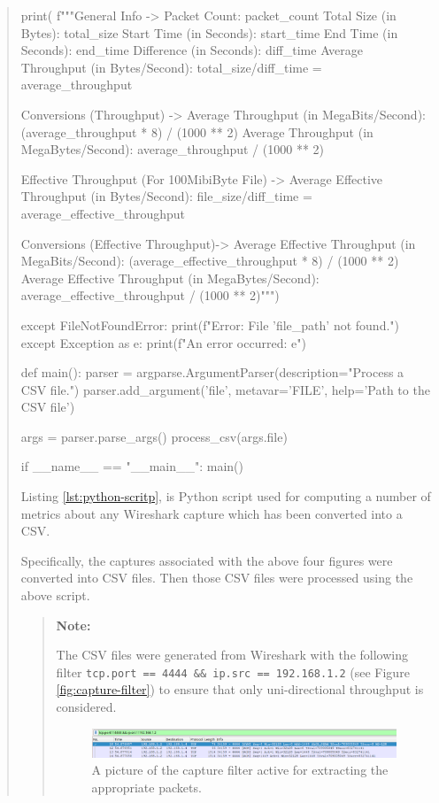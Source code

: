 \documentclass{article}
\newenvironment{ans}
{\fbox{Answer}\begin{quote}\nopagebreak}
{\end{quote}}
\newenvironment{note}{%
\begin{quote}
\begin{tcolorbox}[colback=gray!10,arc=0mm,boxrule=0pt]
\raggedright
\textbf{Note:}%
}{%
\end{tcolorbox}
\end{quote}%
}
\begin{document}
\begin{ans}
\begin{gruvboxlisting}[language=Python,caption={A Python script for computing a
number of statistics about any Wireshark capture.},label={lst:python-scritp}]
print( f"""General Info -> Packet Count: {packet_count}
Total Size (in Bytes): {total_size} Start Time (in
Seconds): {start_time} End Time (in Seconds): {end_time}
Difference (in Seconds): {diff_time} Average Throughput (in
Bytes/Second): {total_size}/{diff_time} =
{average_throughput}

Conversions (Throughput) -> Average Throughput (in
MegaBits/Second): {(average_throughput * 8) / (1000 ** 2)}
Average Throughput (in MegaBytes/Second):
{average_throughput / (1000 ** 2)}

Effective Throughput (For 100MibiByte File) -> Average
Effective Throughput (in Bytes/Second):
{file_size}/{diff_time} = {average_effective_throughput}

Conversions (Effective Throughput)-> Average Effective
Throughput (in MegaBits/Second):
{(average_effective_throughput * 8) / (1000 ** 2)} Average
Effective Throughput (in MegaBytes/Second):
{average_effective_throughput / (1000 ** 2)}""")

except FileNotFoundError: print(f"Error: File '{file_path}'
not found.") except Exception as e: print(f"An error
occurred: {e}")

def main(): parser =
argparse.ArgumentParser(description="Process a CSV file.")
parser.add_argument('file', metavar='FILE', help='Path to
the CSV file')

args = parser.parse_args() process_csv(args.file)

if __name__ == "__main__": main()
\end{gruvboxlisting}

Listing \ref{lst:python-scritp}, is Python script used for
computing a number of metrics about any Wireshark capture
which has been converted into a CSV.

Specifically, the captures associated with the above four
figures were converted into CSV files. Then those CSV files
were processed using the above script.

\begin{note}
The CSV files were generated from Wireshark with the following
filter \texttt{tcp.port == 4444 \&\& ip.src == 192.168.1.2} (see
Figure \ref{fig:capture-filter}) to ensure that only
uni-directional throughput is considered.

\begin{figure}[H]
\centering
\includegraphics[width=12cm]{data/capture-filter.png}
\caption{A picture of the capture filter active for extracting
the appropriate packets.}
\end{figure}


\end{note}
\end{ans}
\end{document}
